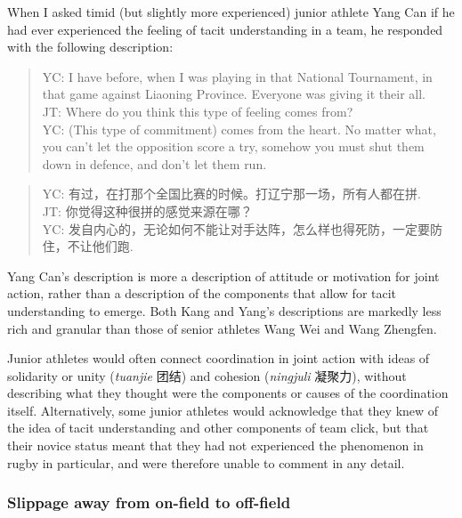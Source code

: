 \begin{CJK}{UTF8}{gbsn}
When I asked timid (but slightly more experienced) junior athlete Yang Can if he had ever experienced the feeling of tacit understanding in a team, he responded with the following description:

    \begin{quote}
      YC: I have before, when I was playing in that National Tournament, in that game against Liaoning Province.  Everyone was giving it their all. \\
      JT: Where do you think this type of feeling comes from? \\
      YC: (This type of commitment) comes from the heart. No matter what, you can’t let the opposition score a try, somehow you must shut them down in defence, and don’t let them run.
    \end{quote}

    \begin{quote}
      YC: 有过，在打那个全国比赛的时候。打辽宁那一场，所有人都在拼.\\
      JT: 你觉得这种很拼的感觉来源在哪？\\
      YC: 发自内心的，无论如何不能让对手达阵，怎么样也得死防，一定要防住，不让他们跑.
    \end{quote}

Yang Can's description is more a description of attitude or motivation for joint action, rather than a description of the components that allow for tacit understanding to emerge.  Both Kang and Yang's descriptions are markedly less rich and granular than those of senior athletes Wang Wei and Wang Zhengfen.

Junior athletes would often connect coordination in joint action with ideas of solidarity or unity (\textit{tuanjie} 团结) and cohesion (\textit{ningjuli} 凝聚力), without describing what they thought were the components or causes of the coordination itself.  Alternatively, some junior athletes would acknowledge that they knew of the idea of tacit understanding and other components of team click, but that their novice status meant that they had not experienced the phenomenon in rugby in particular, and were therefore unable to comment in any detail.







\subsubsection{Slippage away from on-field to off-field}


\end{CJK}
